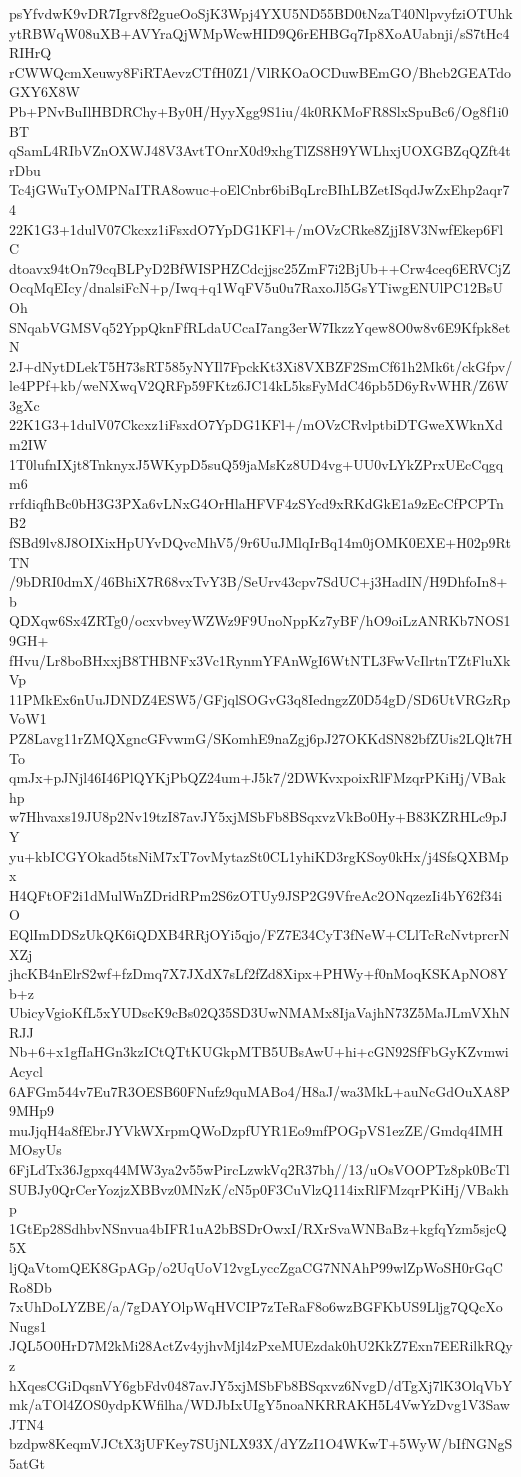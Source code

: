 psYfvdwK9vDR7Igrv8f2gueOoSjK3Wpj4YXU5ND55BD0tNzaT40NlpvyfziOTUhk
ytRBWqW08uXB+AVYraQjWMpWcwHID9Q6rEHBGq7Ip8XoAUabnji/sS7tHc4RIHrQ
rCWWQcmXeuwy8FiRTAevzCTfH0Z1/VlRKOaOCDuwBEmGO/Bhcb2GEATdoGXY6X8W
Pb+PNvBuIlHBDRChy+By0H/HyyXgg9S1iu/4k0RKMoFR8SlxSpuBc6/Og8f1i0BT
qSamL4RIbVZnOXWJ48V3AvtTOnrX0d9xhgTlZS8H9YWLhxjUOXGBZqQZft4trDbu
Tc4jGWuTyOMPNaITRA8owuc+oElCnbr6biBqLrcBIhLBZetISqdJwZxEhp2aqr74
22K1G3+1dulV07Ckcxz1iFsxdO7YpDG1KFl+/mOVzCRke8ZjjI8V3NwfEkep6FlC
dtoavx94tOn79cqBLPyD2BfWISPHZCdcjjsc25ZmF7i2BjUb++Crw4ceq6ERVCjZ
OcqMqEIcy/dnalsiFcN+p/Iwq+q1WqFV5u0u7RaxoJl5GsYTiwgENUlPC12BsUOh
SNqabVGMSVq52YppQknFfRLdaUCcaI7ang3erW7IkzzYqew8O0w8v6E9Kfpk8etN
2J+dNytDLekT5H73sRT585yNYIl7FpckKt3Xi8VXBZF2SmCf61h2Mk6t/ckGfpv/
le4PPf+kb/weNXwqV2QRFp59FKtz6JC14kL5ksFyMdC46pb5D6yRvWHR/Z6W3gXc
22K1G3+1dulV07Ckcxz1iFsxdO7YpDG1KFl+/mOVzCRvlptbiDTGweXWknXdm2IW
1T0lufnIXjt8TnknyxJ5WKypD5suQ59jaMsKz8UD4vg+UU0vLYkZPrxUEcCqgqm6
rrfdiqfhBc0bH3G3PXa6vLNxG4OrHlaHFVF4zSYcd9xRKdGkE1a9zEcCfPCPTnB2
fSBd9lv8J8OIXixHpUYvDQvcMhV5/9r6UuJMlqIrBq14m0jOMK0EXE+H02p9RtTN
/9bDRI0dmX/46BhiX7R68vxTvY3B/SeUrv43cpv7SdUC+j3HadIN/H9DhfoIn8+b
QDXqw6Sx4ZRTg0/ocxvbveyWZWz9F9UnoNppKz7yBF/hO9oiLzANRKb7NOS19GH+
fHvu/Lr8boBHxxjB8THBNFx3Vc1RynmYFAnWgI6WtNTL3FwVcIlrtnTZtFluXkVp
11PMkEx6nUuJDNDZ4ESW5/GFjqlSOGvG3q8IedngzZ0D54gD/SD6UtVRGzRpVoW1
PZ8Lavg11rZMQXgncGFvwmG/SKomhE9naZgj6pJ27OKKdSN82bfZUis2LQlt7HTo
qmJx+pJNjl46I46PlQYKjPbQZ24um+J5k7/2DWKvxpoixRlFMzqrPKiHj/VBakhp
w7Hhvaxs19JU8p2Nv19tzI87avJY5xjMSbFb8BSqxvzVkBo0Hy+B83KZRHLc9pJY
yu+kbICGYOkad5tsNiM7xT7ovMytazSt0CL1yhiKD3rgKSoy0kHx/j4SfsQXBMpx
H4QFtOF2i1dMulWnZDridRPm2S6zOTUy9JSP2G9VfreAc2ONqzezIi4bY62f34iO
EQlImDDSzUkQK6iQDXB4RRjOYi5qjo/FZ7E34CyT3fNeW+CLlTcRcNvtprcrNXZj
jhcKB4nElrS2wf+fzDmq7X7JXdX7sLf2fZd8Xipx+PHWy+f0nMoqKSKApNO8Yb+z
UbicyVgioKfL5xYUDscK9cBs02Q35SD3UwNMAMx8IjaVajhN73Z5MaJLmVXhNRJJ
Nb+6+x1gfIaHGn3kzICtQTtKUGkpMTB5UBsAwU+hi+cGN92SfFbGyKZvmwiAcycl
6AFGm544v7Eu7R3OESB60FNufz9quMABo4/H8aJ/wa3MkL+auNcGdOuXA8P9MHp9
muJjqH4a8fEbrJYVkWXrpmQWoDzpfUYR1Eo9mfPOGpVS1ezZE/Gmdq4IMHMOsyUs
6FjLdTx36Jgpxq44MW3ya2v55wPircLzwkVq2R37bh//13/uOsVOOPTz8pk0BcTl
SUBJy0QrCerYozjzXBBvz0MNzK/cN5p0F3CuVlzQ114ixRlFMzqrPKiHj/VBakhp
1GtEp28SdhbvNSnvua4bIFR1uA2bBSDrOwxI/RXrSvaWNBaBz+kgfqYzm5sjcQ5X
ljQaVtomQEK8GpAGp/o2UqUoV12vgLyccZgaCG7NNAhP99wlZpWoSH0rGqCRo8Db
7xUhDoLYZBE/a/7gDAYOlpWqHVCIP7zTeRaF8o6wzBGFKbUS9Lljg7QQcXoNugs1
JQL5O0HrD7M2kMi28ActZv4yjhvMjl4zPxeMUEzdak0hU2KkZ7Exn7EERilkRQyz
hXqesCGiDqsnVY6gbFdv0487avJY5xjMSbFb8BSqxvz6NvgD/dTgXj7lK3OlqVbY
mk/aTOl4ZOS0ydpKWfilha/WDJbIxUIgY5noaNKRRAKH5L4VwYzDvg1V3SawJTN4
bzdpw8KeqmVJCtX3jUFKey7SUjNLX93X/dYZzI1O4WKwT+5WyW/bIfNGNgS5atGt
